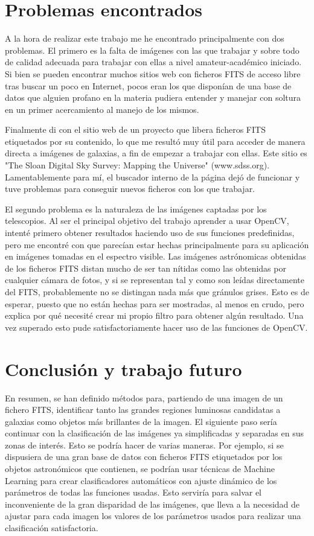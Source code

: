 \documentclass[a4paper,12pt]{article}
\begin{document}
\section{Problemas encontrados}
\label{sec:Problemas}
A la hora de realizar este trabajo me he encontrado principalmente con dos problemas. El primero es la falta de imágenes con las que trabajar y sobre todo de calidad adecuada para trabajar con ellas a nivel amateur-académico iniciado. Si bien se pueden encontrar muchos sitios web con ficheros FITS de acceso libre tras buscar un poco en Internet, pocos eran los que disponían de una base de datos que alguien profano en la materia pudiera entender y manejar con soltura en un primer acercamiento al manejo de los mismos.

Finalmente di con el sitio web de un proyecto que libera ficheros FITS etiquetados por su contenido, lo que me resultó muy útil para acceder de manera directa a imágenes de galaxias, a fin de empezar a trabajar con ellas. Este sitio es "The Sloan Digital Sky Survey: Mapping the Universe" (www.sdss.org). Lamentablemente para mí, el buscador interno de la página dejó de funcionar y tuve problemas para conseguir nuevos ficheros con los que trabajar.

El segundo problema es la naturaleza de las imágenes captadas por los telescopios. Al ser el principal objetivo del trabajo aprender a usar OpenCV, intenté primero obtener resultados haciendo uso de sus funciones predefinidas, pero me encontré con que parecían estar hechas principalmente para su aplicación en imágenes tomadas en el espectro visible. Las imágenes astrónomicas obtenidas de los ficheros FITS distan mucho de ser tan nítidas como las obtenidas por cualquier cámara de fotos, y si se representan tal y como son leídas directamente del FITS, probablemente no se distingan nada más que gránulos grises. Esto es de esperar, puesto que no están hechas para ser mostradas, al menos en crudo, pero explica por qué necesité crear mi propio filtro para obtener algún resultado. Una vez superado esto pude satisfactoriamente hacer uso de las funciones de OpenCV.



\section{Conclusión y trabajo futuro}
En resumen, se han definido métodos para, partiendo de una imagen de un fichero FITS, identificar tanto las grandes regiones luminosas candidatas a galaxias como objetos más brillantes de la imagen. El siguiente paso sería continuar con la clasificación de las imágenes ya simplificadas y separadas en sus zonas de interés. Esto se podría hacer de varias maneras. Por ejemplo, si se dispusiera de una gran base de datos con ficheros FITS etiquetados por los objetos astronómicos que contienen, se podrían usar técnicas de Machine Learning para crear clasificadores automáticos con ajuste dinámico de los parámetros de todas las funciones usadas. Esto serviría para salvar el inconveniente de la gran disparidad de las imágenes, que lleva a la necesidad de ajustar para cada imagen los valores de los parámetros usados para realizar una clasificación satisfactoria.
\end{document}
